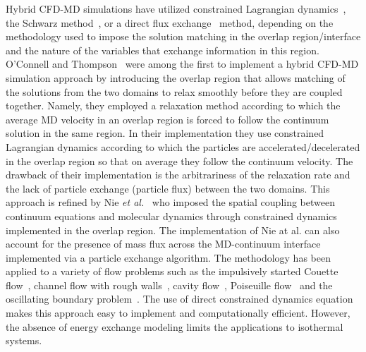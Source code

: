 \documentclass[preprint,12pt]{elsarticle}
\begin{document}
Hybrid CFD-MD simulations have utilized constrained Lagrangian dynamics~\cite{Thompson,Nie,Nie_cavity,Cui,Wang,Yen,Liu}, the Schwarz method~\cite{Hadjicon1,Hadjicon2,Hadjicon3,Werder,Kotsalis}, or a direct flux exchange~\cite{Flekkoy,Wagner,Delgado1,USHER,Time_Mechanism,Giupponi} method, depending on the methodology used to impose the solution matching in the overlap region/interface and the nature of the variables that exchange information in this region. 
O'Connell and Thompson~\cite{Thompson} 
were among the first to implement a hybrid CFD-MD simulation approach by introducing the overlap region that allows matching of the solutions from the two domains to relax smoothly before they are coupled together. Namely, they employed a relaxation method according to which the average MD velocity in an overlap region is forced to follow the continuum solution in the same region. In their implementation they use constrained Lagrangian dynamics according to which the particles are accelerated/decelerated in the overlap region so that on average they follow the continuum velocity. The drawback of their implementation is the arbitrariness of the relaxation rate and the lack of particle exchange (particle flux) between the two domains. 
This approach is refined by Nie {\it{et al.}}~\cite{Nie} 
who imposed the spatial coupling between continuum equations and molecular dynamics through constrained dynamics implemented in the overlap region. The implementation of Nie at al. can also account for the presence of mass flux across the MD-continuum interface implemented via a particle exchange algorithm. The methodology has been applied to a variety of flow problems such as the impulsively started Couette flow~\cite{Thompson}, channel flow with rough walls~\cite{Nie}, cavity flow~\cite{Nie_cavity}, Poiseuille flow~\cite{Yen} and the oscillating boundary problem~\cite{Wang,Liu}. The use of direct constrained dynamics equation makes this approach easy to implement and computationally efficient. However, the absence of energy exchange modeling limits the applications to isothermal systems.~\cite{Flekkoy}
\end{document}
